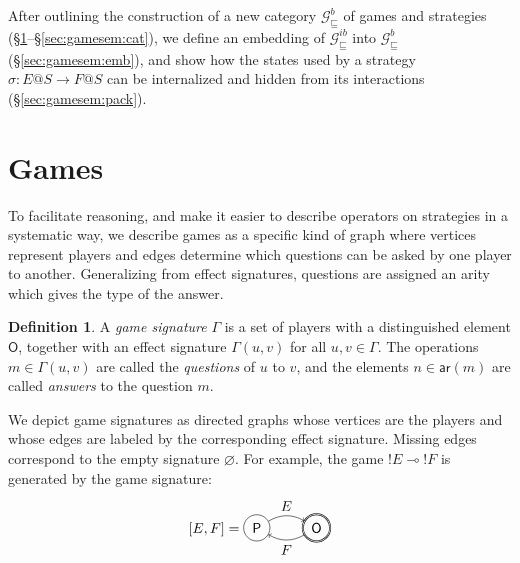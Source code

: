 \documentclass[draft,11pt]{report}
\theoremstyle{definition}
\newtheorem{definition}[theorem]{Definition}
\newcommand{\gcat}{\mathcal{G}_{\sqsubseteq}}
\newcommand{\kw}[1]{\ensuremath{ \mathsf{#1} }}
\begin{document}
After outlining the construction of a new category $\gcat^b$
of games and strategies
(\S\ref{sec:gamesem:games}--\S\ref{sec:gamesem:cat}),
we define an embedding of
$\gcat^{ib}$ into $\gcat^b$
(\S\ref{sec:gamesem:emb}),
and show how the states used by a strategy
$\sigma : E@S \rightarrow F@S$
can be internalized and
hidden from its interactions
(\S\ref{sec:gamesem:pack}).


\section{Games} \label{sec:gamesem:games} %

To facilitate reasoning,
and make it easier to describe operators on strategies
in a systematic way,
we describe games as a specific kind of graph
where vertices represent players
and edges determine which questions can be asked
by one player to another.
Generalizing from effect signatures,
questions are assigned an arity
which gives the type of the answer.

\begin{definition}
A \emph{game signature} $\Gamma$
is a set of players with a distinguished element $\kw{O}$,
together with an effect signature $\Gamma(u, v)$
for all $u, v \in \Gamma$.
The operations $m \in \Gamma(u, v)$ are called
the \emph{questions} of $u$ to $v$,
and the elements $n \in \kw{ar}(m)$ are called
\emph{answers} to the question $m$.
\end{definition}

We depict game signatures as directed graphs
whose vertices are the players and
whose edges are labeled by the corresponding effect signature.
Missing edges correspond to the empty signature $\varnothing$.
For example,
the game ${!E} \multimap {!F}$ is generated by
the game signature:
\[
  [E,F] =
  \begin{tikzpicture}[baseline=(O.base),scale=1.5]
    \node[circle,draw,double] (O) at (0,0) {$\kw{O}$};
    \node[circle,draw] (P) at (-1,0) {$\kw{P}$};
    \path[->] (P) edge[bend left] node[above] {$E$} (O);
    \path[->] (O) edge[bend left] node[below] {$F$} (P);
  \end{tikzpicture}
\]
\end{document}
